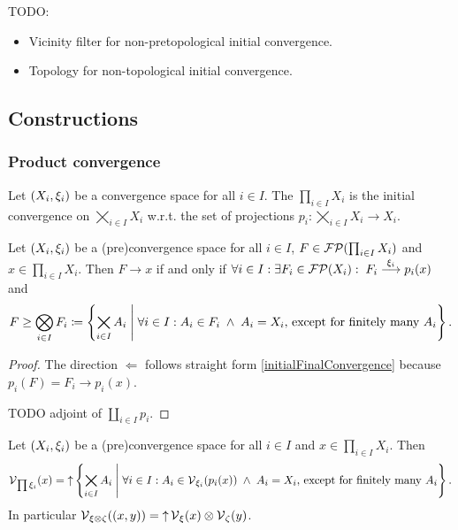 TODO:
\begin{itemize}
\item Vicinity filter for non-pretopological initial convergence.
\item Topology for non-topological initial convergence.
\end{itemize}


\subsection{Constructions}
\subsubsection{Product convergence}
\begin{definition}
Let $\left( X_i, \xi_i \right)$ be a convergence space for all $i\in I$. The  $\prod_{i\in I}X_i$ is the initial convergence on $\bigtimes_{i\in I}X_i$ w.r.t. the set of projections $p_i: \bigtimes_{i\in I}X_i \to X_i$.
\end{definition}

\begin{proposition} \label{convergenceProductFilter}
Let $\left( X_i, \xi_i \right)$ be a (pre)convergence space for all $i\in I$, $F \in \operatorname{\mathcal{FP}}(\prod_{i\in I}X_i)$ and $x\in \prod_{i\in I}X_i$. Then $F\to x$ \textup{if and only if} $\forall i\in I: \exists F_i\in \operatorname{\mathcal{FP}}(X_i): 
\; F_i \overset{\xi_i}{\longrightarrow} p_i(x)$ and
\[ F \geq \bigotimes_{i\in I}F_i \coloneqq \left\{ \bigtimes_{i\in I}A_i \;\middle|\; \forall i\in I: A_i \in F_i \;\land\; A_i = X_i, \,\text{except for finitely many $A_i$} \right\}. \]
\end{proposition}
\begin{proof}
The direction $\Leftarrow$ follows straight form \ref{initialFinalConvergence} because $p_i(F) = F_i \to p_i(x)$.

TODO adjoint of $\coprod_{i\in I}p_i$.
\end{proof}
\begin{corollary} \label{productVicinity}
Let $\left( X_i, \xi_i \right)$ be a (pre)convergence space for all $i\in I$ and $x\in \prod_{i\in I}X_i$. Then
\[\operatorname{\mathcal{V}}_{\prod \xi_i}(x) = \operatorname{\uparrow} \left\{ \bigtimes_{i\in I}A_i \;\middle|\; \forall i\in I: A_i \in \operatorname{\mathcal{V}}_{\xi_i}(p_i(x)) \;\land\; A_i = X_i, \,\text{except for finitely many $A_i$} \right\}. \]
In particular $\operatorname{\mathcal{V}}_{\xi\otimes \zeta}((x,y)) = \operatorname{\uparrow} \operatorname{\mathcal{V}}_\xi(x)\otimes \operatorname{\mathcal{V}}_\zeta(y)$.
\end{corollary}

